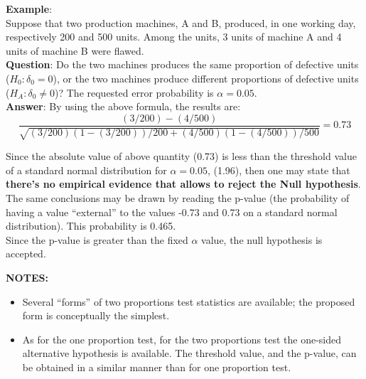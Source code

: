 \begin{frame}
  \vspace{0.25cm}
  \textbf{Example}:\\
  Suppose that two production machines, A and B, produced, in one working day, respectively 200 and 500 units. Among the units, 3 units of machine A and 4 units of machine B were flawed.\\
  \vspace{0.25cm}
  \textbf{Question}: Do the two machines produces the same proportion of defective units ($H_0: \delta_0=0$), or the two machines produce different proportions of defective units ($H_A:\delta_0 \neq 0$)? The requested error probability is $\alpha = 0.05 $.\\
  \vspace{0.25cm}
  \textbf{Answer}:
  By using the above formula, the results are:
  $$ \frac{(3/200) - (4/500)}{\sqrt{(3/200) (1 - (3/200)) / 200 + (4/500) (1 - (4/500)) / 500}} = 0.73 $$
\end{frame}

\begin{frame}
  \vspace{0.25cm}
  Since the absolute value of above quantity (0.73) is less than the threshold value of a standard normal distribution for $ \alpha = 0.05 $, (1.96), then one may state that \textbf{there's no empirical evidence that allows to reject the Null hypothesis}.\\
  \vspace{0.5cm}
  The same conclusions may be drawn by reading the p-value (the probability of having a value ``external'' to the values -0.73 and 0.73 on a standard normal distribution). This probability is 0.465.\\
  Since the p-value is greater than the fixed $ \alpha $ value, the null hypothesis is accepted.
\end{frame}

\begin{frame}
  \vspace{0.5cm}
  \textbf{NOTES:}\\
  \vspace{0.75cm}
  \begin{itemize}
    \item Several ``forms'' of two proportions test statistics are available; the proposed form is conceptually the simplest.\\
    \vspace{0.75cm}
    \item As for the one proportion test, for the two proportions test the one-sided alternative hypothesis is available. The threshold value, and the p-value, can be obtained in a similar manner than for one proportion test.
  \end{itemize}
\end{frame}

